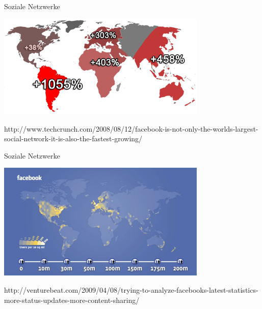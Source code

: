 \documentclass[11pt]{beamer}
\begin{document}
\begin{frame}[t]{Soziale Netzwerke}
  \begin{center}
    \includegraphics[width=0.75\textwidth]{growth}

    {\tiny
    http://www.techcrunch.com/2008/08/12/facebook-is-not-only-the-worlds-largest-social-network-it-is-also-the-fastest-growing/
    }
  \end{center}
\end{frame}

\begin{frame}[t]{Soziale Netzwerke}
  \begin{center}
    \includegraphics[width=0.75\textwidth]{fbmap}

    {\tiny
    http://venturebeat.com/2009/04/08/trying-to-analyze-facebooks-latest-statistics-more-status-updates-more-content-sharing/
    }
  \end{center}
\end{frame}

\end{document}
